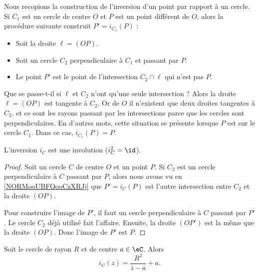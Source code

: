 \begin{normaltext}      \label{NORMooUBFQooCzXRJj}
    Nous recopions la construction de l'inversion d'un point par rapport à un cercle. Si \( C_1\) est un cercle de centre \( O\) et \( P\) est un point différent de \( O\), alors la procédure suivante construit \( P'=i_{C_1}(P)\) :
    \begin{itemize}
        \item Soit la droite \( \ell=(OP)\).
        \item Soit un cercle \( C_2\) perpendiculaire à \( C_1\) et passant par \( P\).
        \item Le point \( P'\) est le point de l'intersection \( C_2\cap\ell\) qui n'est pas \( P\).
    \end{itemize}
    Que se passe-t-il si \( \ell\) et \( C_2\) n'ont qu'une seule intersection ? Alors la droite \( \ell=(OP)\) est tangente à \( C_2\). Or de \( O \) il n'existent que deux droites tangentes à \( C_2\), et ce sont les rayons passant par les intersections parce que les cercles sont perpendiculaires. En d'autres mots, cette situation se présente lorsque \( P\) est sur le cercle \( C_1\). Dans ce cas, \( i_{C_1}(P)=P\).
\end{normaltext}

\begin{corollary}
    L'inversion \( i_C\) est une involution (\( i_C^2=\id\)).
\end{corollary}

\begin{proof}
    Soit un cercle \( C\) de centre \( O\) et un point \( P\). Si \( C_2\) est un cercle perpendiculaire à \( C\) passant par \( P\), alors nous avons vu en \ref{NORMooUBFQooCzXRJj} que \( P'=i_C(P)\) est l'autre intersection entre \( C_2\) et la droite \( (OP)\).

    Pour construire l'image de \( P'\), il faut un cercle perpendiculaire à \( C\) passant par \( P'\). Le cercle \( C_2\) déjà utilisé fait l'affaire. Ensuite, la droite \( (OP')\) est la même que la droite \( (OP)\). Donc l'image de \( P'\) est \( P\).
\end{proof}

\begin{proposition}
    Soit le cercle de rayon \( R\) et de centre \( a\in \eC\). Alors 
    \begin{equation}
        i_C(z)=\frac{ R^2 }{ \bar z-\bar a }+a.
    \end{equation}
\end{proposition}

